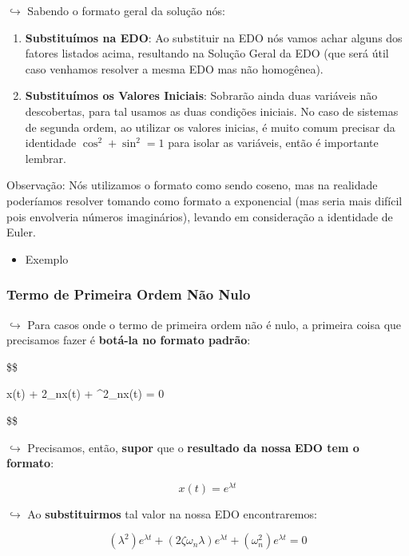 \documentclass{article}
\begin{document}
\begin{itemize}
\(\hookrightarrow\) Sabendo o formato geral da solução nós:

\begin{enumerate}
\def\labelenumi{\arabic{enumi}.}
\tightlist
\item
  \textbf{Substituímos na EDO}: Ao substituir na EDO nós vamos achar
  alguns dos fatores listados acima, resultando na Solução Geral da EDO
  (que será útil caso venhamos resolver a mesma EDO mas não homogênea).
\item
  \textbf{Substituímos os Valores Iniciais}: Sobrarão ainda duas
  variáveis não descobertas, para tal usamos as duas condições iniciais.
  No caso de sistemas de segunda ordem, ao utilizar os valores inicias,
  é muito comum precisar da identidade \(\cos ^2 + \sin^2 = 1\) para
  isolar as variáveis, então é importante lembrar.
\end{enumerate}

Observação: Nós utilizamos o formato como sendo coseno, mas na realidade
poderíamos resolver tomando como formato a exponencial (mas seria mais
difícil pois envolveria números imaginários), levando em consideração a
identidade de Euler.

\begin{itemize}
\tightlist
\item
  Exemplo
\end{itemize}

\hypertarget{termo-de-primeira-ordem-nuxe3o-nulo}{%
\subsubsection{Termo de Primeira Ordem Não
Nulo}\label{termo-de-primeira-ordem-nuxe3o-nulo}}

\(\hookrightarrow\) Para casos onde o termo de primeira ordem não é
nulo, a primeira coisa que precisamos fazer é \textbf{botá-la no formato
padrão}:

\$\$

\ddot x(t) + 2\zeta \omega \_n\dot x(t) + \omega\^{}2\_nx(t) = 0

\$\$

\(\hookrightarrow\) Precisamos, então, \textbf{supor} que o
\textbf{resultado da nossa} \textbf{EDO tem o formato}:

\[
x(t) = e^{\lambda t}
\]

\(\hookrightarrow\) Ao \textbf{substituirmos} tal valor na nossa EDO
encontraremos:

\[
(\lambda^2)e^{\lambda t} + (2\zeta \omega_n \lambda )e^{\lambda t} + (\omega_n^2) e^{\lambda t} = 0
\]


\end{itemize}
\end{document}
